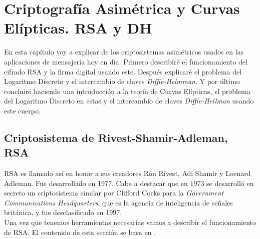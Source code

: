 \chapter{Criptografía Asimétrica y Curvas Elípticas. RSA y DH}
\label{chap:cinco}

En esta capítulo voy a explicar de los criptosistemas asimétricos usados en las aplicaciones de mensajería hoy en día. Primero describiré el funcionamiento del cifrado RSA y la firma digital usando este. Después explicaré el problema del Logaritmo Discreto y el intercambio de claves \emph{Diffie-Helmman}. Y por último concluiré haciendo una introducción a la teoría de Curvas Elípticas, el problema del Logaritmo Discreto en estas y el intercambio de claves \emph{Diffie-Hellman} usando este cuerpo.\\

\section{Criptosistema de Rivest-Shamir-Adleman, RSA}
RSA es llamado así en honor a sus creadores Ron Rivest, Adi Shamir y Loenard Adleman. Fue desarrollado en 1977. Cabe a destacar que en 1973 se desarrolló en secreto un criptosistema similar por Clifford Cocks para la \emph{Government Communications Headquarters}, que es la agencia de inteligencia de señales británica, y fue desclasificado en 1997\cite{cliffordCocks}.\\
Una vez que tenemos herramientas necesarias vamos a describir el funcionamiento de RSA. El contenido de esta sección se basa en \cite{angelRiosMateos}.\\

